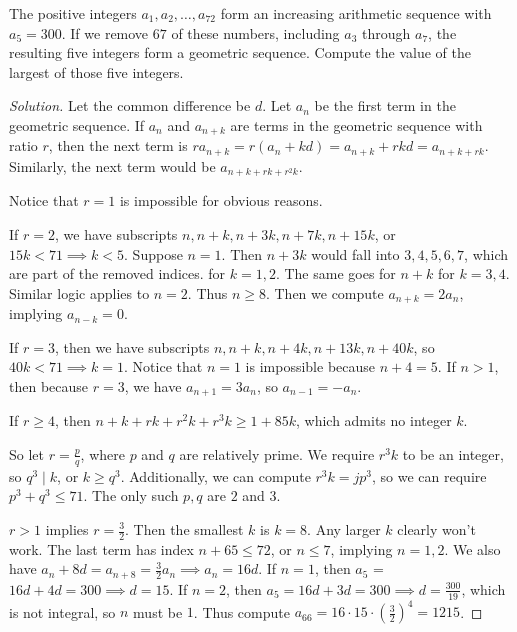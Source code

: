 \begin{prb}[2008 ARML T-10]
The positive integers $a_1, a_2, \dots, a_{72}$ form an increasing arithmetic
sequence with $a_5 = 300$. If we remove $67$ of these numbers, including $a_3$
through $a_7$, the resulting five integers form a geometric sequence. Compute
the value of the largest of those five integers.
\end{prb}

\ifsolutions
\begin{proof}[Solution]
Let the common difference be $d$. Let $a_n$ be the first term in the geometric
sequence. If $a_n$ and $a_{n + k}$ are terms in the geometric sequence with
ratio $r$, then the next term is $ra_{n + k} = r (a_n + kd) = a_{n + k} + rkd =
a_{n + k + rk}$. Similarly, the next term would be $a_{n + k + rk + r^2 k}$.

Notice that $r = 1$ is impossible for obvious reasons.

If $r = 2$, we have subscripts $n, n + k, n + 3k, n + 7k, n + 15k$, or $15k < 71
\implies k < 5$. Suppose $n = 1$.  Then $n + 3k$ would fall into $3, 4, 5, 6,
7$, which are part of the removed indices. for $k = 1, 2$. The same goes for $n
+ k$ for $k = 3, 4$. Similar logic applies to $n = 2$. Thus $n \geq 8$. Then we
compute $a_{n + k} = 2a_n$, implying $a_{n - k} = 0$.

If $r = 3$, then we have subscripts $n, n + k, n + 4k, n + 13k, n + 40k$, so
$40k < 71 \implies k = 1$. Notice that $n = 1$ is impossible because $n + 4 =
5$. If $n > 1$, then because $r = 3$, we have $a_{n + 1} = 3 a_n$, so $a_{n - 1}
= -a_n$.

If $r \geq 4$, then $n + k + rk + r^2 k + r^3 k \geq 1 + 85k$, which admits no
integer $k$.

So let $r = \frac{p}{q}$, where $p$ and $q$ are relatively prime. We require
$r^3 k$ to be an integer, so $q^3 \mid k$, or $k \geq q^3$. Additionally, we can
compute $r^3 k = j p^3$, so we can require $p^3 + q^3 \leq 71$. The only such
$p, q$ are $2$ and $3$.

$r > 1$ implies $r = \frac{3}{2}$. Then the smallest $k$ is $k = 8$. Any larger
$k$ clearly won't work. The last term has index $n + 65 \leq 72$, or $n \leq 7$,
implying $n = 1, 2$. We also have $a_n + 8d = a_{n + 8} = \frac{3}{2} a_n
\implies a_n = 16d$. If $n = 1$, then $a_5$ = $16d + 4d = 300 \implies d = 15$.
If $n = 2$, then $a_5 = 16d + 3d = 300 \implies d = \frac{300}{19}$, which is
not integral, so $n$ must be $1$. Thus compute $a_{66} = 16 \cdot 15 \cdot
\left( \frac{3}{2} \right)^4 = \boxed{1215}$.
\end{proof}
\fi

